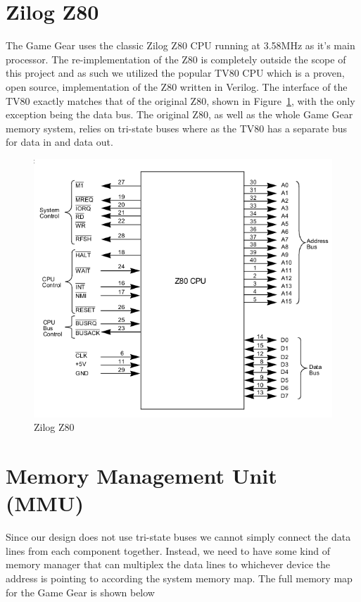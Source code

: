 \documentclass{article}
\begin{document}
\section{Zilog Z80}
The Game Gear uses the classic Zilog Z80 CPU running at 3.58MHz as it's main
processor.  The re-implementation of the Z80 is completely outside the scope of
this project and as such we utilized the popular TV80 \cite{tv80} CPU which is
a proven, open source, implementation of the Z80 written in Verilog.  The
interface of the TV80 exactly matches that of the original Z80, shown in
Figure~\ref{fig:z80}, with the only exception being the data bus. The original
Z80, as well as the whole Game Gear memory system, relies on tri-state buses
where as the TV80 has a separate bus for data in and data out.

\begin{figure}[H]
\centering
\includegraphics[scale=0.4]{../images/z80.png}
\caption{Zilog Z80}
\label{fig:z80}
\end{figure}

\section{Memory Management Unit (MMU)}
Since our design does not use tri-state buses we cannot simply connect the data
lines from each component together. Instead, we need to have some kind of
memory manager that can multiplex the data lines to whichever device the
address is pointing to according the system memory map. The full memory map for
the Game Gear is shown below
\end{document}
